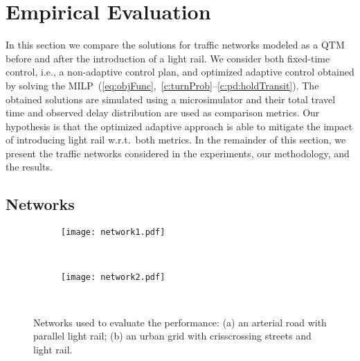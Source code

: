 \section{Empirical Evaluation}
  
In this section we compare the solutions for traffic networks modeled as a QTM
before and after the introduction of a light rail.
%
We consider both fixed-time control, i.e., a non-adaptive control plan, and
optimized adaptive control obtained by solving the
MILP~(\ref{eq:objFunc},~\ref{c:turnProb}--\ref{c:pd:holdTransit}).
%
The obtained solutions are simulated using a microsimulator and their total
travel time and observed delay distribution are used as comparison metrics.
%
Our hypothesis is that the optimized adaptive approach is able to mitigate the
impact of introducing light rail w.r.t.\ both metrics.
%
In the remainder of this section, we present the traffic networks considered in
the experiments, our methodology, and the results.






\subsection{Networks}

\begin{figure}[t!]
\centering
\begin{subfigure}{0.47\textwidth}
\texttt{[image: network1.pdf]}
\caption{~}
\label{fig:net:arterial}
\vspace{3mm}
\end{subfigure}
\begin{subfigure}{0.50\textwidth}
\texttt{[image: network2.pdf]}
\label{fig:net:grid}
\caption{~}
\end{subfigure}
\caption{Networks used to evaluate the performance:
  (a) an arterial road with parallel light rail;
  (b) an urban grid with crisscrossing streets and light rail.
%
}
\label{fig:networks}
\end{figure}


